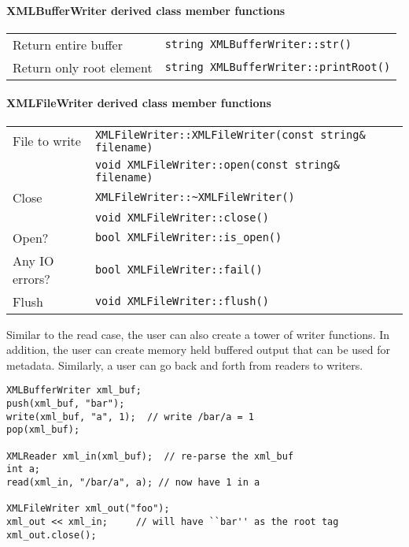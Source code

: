\documentclass[12pt,letterpaper]{article}
\begin{document}
\paragraph{XMLBufferWriter derived class member functions}

\begin{flushleft}
  \begin{tabular}{|l|l|}
  \hline
  Return entire buffer  & \verb|string XMLBufferWriter::str()|\\
  Return only root element & \verb|string XMLBufferWriter::printRoot()|\\
  \hline
 \end{tabular}
\end{flushleft}


\paragraph{XMLFileWriter derived class member functions}

\begin{flushleft}
  \begin{tabular}{|l|l|}
  \hline
  File to write  & \verb|XMLFileWriter::XMLFileWriter(const string& filename)|\\
                 & \verb|void XMLFileWriter::open(const string& filename)|\\
  \hline
  Close          & \verb|XMLFileWriter::~XMLFileWriter()|\\
                 & \verb|void XMLFileWriter::close()|\\
  \hline
  Open?          & \verb|bool XMLFileWriter::is_open()| \\
  \hline
  Any IO errors? & \verb|bool XMLFileWriter::fail()| \\
  \hline
  Flush          & \verb|void XMLFileWriter::flush()| \\
  \hline
 \end{tabular}
\end{flushleft}
%
Similar to the read case, the user can also create a tower of writer functions.
In addition, the user can create memory held buffered output that can be
used for metadata. Similarly, a user can go back and forth from readers to
writers.
%
\begin{verbatim}
XMLBufferWriter xml_buf;
push(xml_buf, "bar");
write(xml_buf, "a", 1);  // write /bar/a = 1
pop(xml_buf);

XMLReader xml_in(xml_buf);  // re-parse the xml_buf
int a;
read(xml_in, "/bar/a", a); // now have 1 in a

XMLFileWriter xml_out("foo");
xml_out << xml_in;     // will have ``bar'' as the root tag
xml_out.close();
\end{verbatim}
\end{document}
